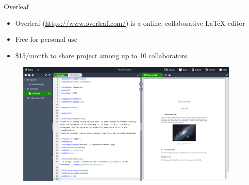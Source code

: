 \begin{frame}{Overleaf}
  \begin{itemize}
    \item \alert{Overleaf} (\url{https://www.overleaf.com/}) is a online, collaborative LaTeX editor
    \item Free for personal use
    \item \$15/month to share project among up to 10 collaborators
  \end{itemize}

  \begin{figure}
    \centering
    \includegraphics[width=.7\linewidth]{./figs/overleaf.png}
  \end{figure}
\end{frame}

